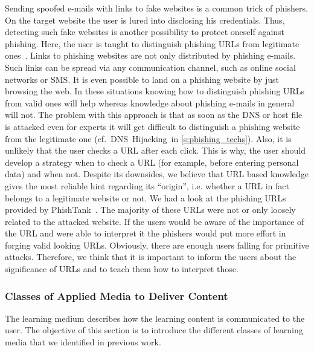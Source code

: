 \begin{description}[leftmargin=0cm]
	\item[URL Based Knowledge:] Sending spoofed e-mails with links to fake websites is a common trick of phishers.
 On the target website the user is lured into disclosing his credentials.
 Thus, detecting such fake websites is another possibility to protect oneself against phishing.
 Here, the user is taught to distinguish phishing URLs from legitimate ones~\cite{sheng2007antiphishingphil, arachchilage2012designing}. 
Links to phishing websites are not only distributed by phishing e-mails.
 Such links can be spread via any communication channel, such as online social networks or SMS.
 It is even possible to land on a phishing website by just browsing the web.
 In these situations knowing how to distinguish phishing URLs from valid ones will help whereas knowledge about phishing e-mails in general will not.
 The problem with this approach is that as soon as the DNS or host file is attacked even for experts it will get difficult to distinguish a phishing website from the legitimate one (cf.~DNS~Hijacking~in \autoref{s:phishing_techs}).
 Also, it is unlikely that the user checks a URL after each click. This is why, the user should develop a strategy when to check a URL (for example, before entering personal data) and when not.
Despite its downsides, we believe that URL based knowledge gives the most reliable hint regarding its ``origin'', i.e. whether a URL in fact belongs to a legitimate website or not.
We had a look at the phishing URLs provided by PhishTank~\cite{phishtank}. The majority of these URLs were not or only loosely related to the attacked website. If the users would be aware of the importance of the URL and were able to interpret it the phishers would put more effort in forging valid looking URLs. Obviously, there are enough users falling for primitive attacks. Therefore, we think that it is important to inform the users about the significance of URLs and to teach them how to interpret those.
\end{description}


\subsubsection{Classes of Applied Media to Deliver Content}
\label{s:medium_classification}
The learning medium describes how the learning content is communicated to the user. 
The objective of this section is to introduce the different classes of learning media that we identified in previous work.

